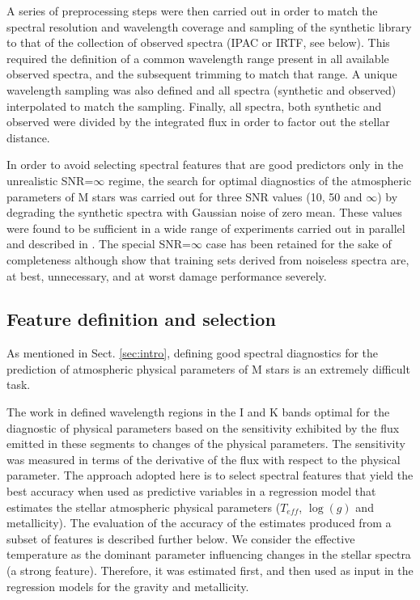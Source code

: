 A series of preprocessing steps were then carried out in order to
match the spectral resolution and wavelength coverage and sampling of
the synthetic library to that of the collection of observed spectra
(IPAC or IRTF, see below). This required the definition of a common
wavelength range present in all available observed spectra, and the
subsequent trimming to match that range. A unique wavelength sampling
was also defined and all spectra (synthetic and observed) interpolated
to match the sampling. Finally, all spectra, both synthetic and
observed were divided by the integrated flux in order to factor out
the stellar distance.

In order to avoid selecting spectral features that are good predictors
only in the unrealistic SNR=$\infty$ regime, the search for optimal
diagnostics of the atmospheric parameters of M stars was carried out
for three SNR values (10, 50 and $\infty$) by degrading the synthetic
spectra with Gaussian noise of zero mean. These values were found to
be sufficient in a wide range of experiments carried out in parallel
and described in \cite{2017MNRAS.465.4556G}. The special SNR=$\infty$
case has been retained for the sake of completeness
although \cite{2017MNRAS.465.4556G} show that training sets derived
from noiseless spectra are, at best, unnecessary, and at worst damage
performance severely.

\subsection{Feature definition and selection}
\label{subsec:FD}

As mentioned in Sect. \ref{sec:intro}, defining good spectral
diagnostics for the prediction of atmospheric physical parameters of M
stars is an extremely difficult task.

The work in \cite{cesetti} defined wavelength regions in the I and K
bands optimal for the diagnostic of physical parameters based on the
sensitivity exhibited by the flux emitted in these segments to changes
of the physical parameters. The sensitivity was measured in terms of
the derivative of the flux with respect to the physical parameter. The
approach adopted here is to select spectral features that yield the
best accuracy when used as predictive variables in a regression model
that estimates the stellar atmospheric physical parameters ($T_{eff}$,
$\log(g)$ and metallicity). The evaluation of the accuracy of the
estimates produced from a subset of features is described further
below. 
We consider the effective temperature as the dominant parameter
influencing changes in the stellar spectra (a strong feature). Therefore,
it was estimated first, and then used as input in the regression
models for the gravity and metallicity.

